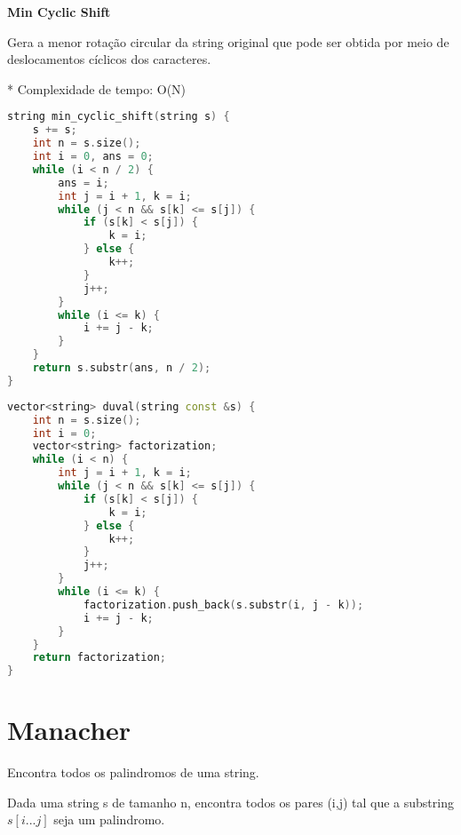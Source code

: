 \documentclass[11pt, a4paper, oneside]{book}
\begin{document}
\textbf{Min Cyclic Shift} 



Gera a menor rotação circular da string original que pode ser obtida por meio de deslocamentos cíclicos dos caracteres.



* Complexidade de tempo: O(N)



\hfill

\begin{multicols}{2}
\begin{lstlisting}[language=C++]
string min_cyclic_shift(string s) {
    s += s;
    int n = s.size();
    int i = 0, ans = 0;
    while (i < n / 2) {
        ans = i;
        int j = i + 1, k = i;
        while (j < n && s[k] <= s[j]) {
            if (s[k] < s[j]) {
                k = i;
            } else {
                k++;
            }
            j++;
        }
        while (i <= k) {
            i += j - k;
        }
    }
    return s.substr(ans, n / 2);
}
\end{lstlisting}
\end{multicols}

\hfill

\begin{multicols}{2}
\begin{lstlisting}[language=C++]
vector<string> duval(string const &s) {
    int n = s.size();
    int i = 0;
    vector<string> factorization;
    while (i < n) {
        int j = i + 1, k = i;
        while (j < n && s[k] <= s[j]) {
            if (s[k] < s[j]) {
                k = i;
            } else {
                k++;
            }
            j++;
        }
        while (i <= k) {
            factorization.push_back(s.substr(i, j - k));
            i += j - k;
        }
    }
    return factorization;
}
\end{lstlisting}
\end{multicols}

\hfill

\section{Manacher}


Encontra todos os palindromos de uma string.



Dada uma string s de tamanho n, encontra todos os pares (i,j) tal que a substring $s[i...j]$ seja um palindromo.
\end{document}
